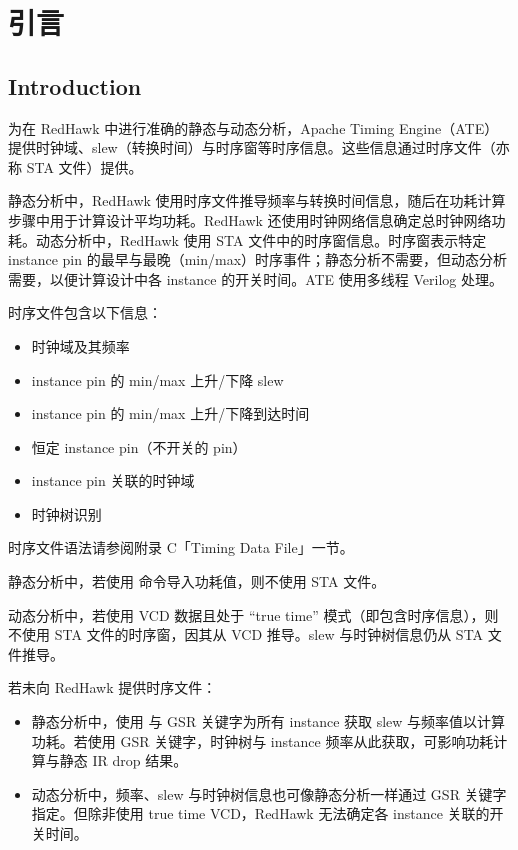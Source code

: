 ﻿%
\label{chap:ate}

\section{引言}
\subsection*{Introduction}

为在 RedHawk 中进行准确的静态与动态分析，Apache Timing Engine（ATE）提供时钟域、slew（转换时间）与时序窗等时序信息。这些信息通过时序文件（亦称 STA 文件）提供。

静态分析中，RedHawk 使用时序文件推导频率与转换时间信息，随后在功耗计算步骤中用于计算设计平均功耗。RedHawk 还使用时钟网络信息确定总时钟网络功耗。动态分析中，RedHawk 使用 STA 文件中的时序窗信息。时序窗表示特定 instance pin 的最早与最晚（min/max）时序事件；静态分析不需要，但动态分析需要，以便计算设计中各 instance 的开关时间。ATE 使用多线程 Verilog 处理。

时序文件包含以下信息：
\begin{itemize}
  \item 时钟域及其频率
  \item instance pin 的 min/max 上升/下降 slew
  \item instance pin 的 min/max 上升/下降到达时间
  \item 恒定 instance pin（不开关的 pin）
  \item instance pin 关联的时钟域
  \item 时钟树识别
\end{itemize}

时序文件语法请参阅附录 C「Timing Data File」一节。

静态分析中，若使用  命令导入功耗值，则不使用 STA 文件。

动态分析中，若使用 VCD 数据且处于 ``true time'' 模式（即包含时序信息），则不使用 STA 文件的时序窗，因其从 VCD 推导。slew 与时钟树信息仍从 STA 文件推导。

若未向 RedHawk 提供时序文件：
\begin{itemize}
  \item 静态分析中，使用  与  GSR 关键字为所有 instance 获取 slew 与频率值以计算功耗。若使用  GSR 关键字，时钟树与 instance 频率从此获取，可影响功耗计算与静态 IR drop 结果。
  \item 动态分析中，频率、slew 与时钟树信息也可像静态分析一样通过 GSR 关键字指定。但除非使用 true time VCD，RedHawk 无法确定各 instance 关联的开关时间。
\end{itemize}

